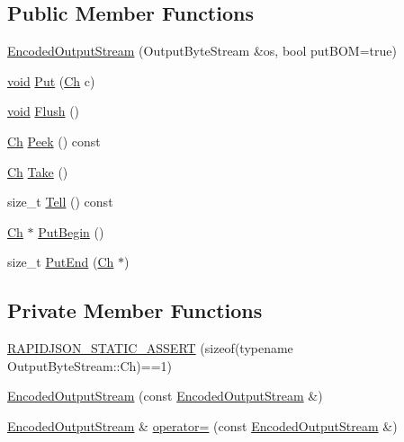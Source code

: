 \subsection*{Public Member Functions}
\begin{DoxyCompactItemize}
\item 
\hyperlink{classEncodedOutputStream_ad3360c613a30a6a15526ae9ad63bd004}{Encoded\+Output\+Stream} (Output\+Byte\+Stream \&os, bool put\+B\+OM=true)
\item 
\hyperlink{imgui__impl__opengl3__loader_8h_ac668e7cffd9e2e9cfee428b9b2f34fa7}{void} \hyperlink{classEncodedOutputStream_a0f3c00f94c195a38d78c05ecda497481}{Put} (\hyperlink{classEncodedOutputStream_aa8f494d7ee2808307fbc9cd658c0f760}{Ch} c)
\item 
\hyperlink{imgui__impl__opengl3__loader_8h_ac668e7cffd9e2e9cfee428b9b2f34fa7}{void} \hyperlink{classEncodedOutputStream_a657188f6a9f0fae01a4012c288d3fd46}{Flush} ()
\item 
\hyperlink{classEncodedOutputStream_aa8f494d7ee2808307fbc9cd658c0f760}{Ch} \hyperlink{classEncodedOutputStream_a22e00087e16ad7a12438fb34fb562bb7}{Peek} () const
\item 
\hyperlink{classEncodedOutputStream_aa8f494d7ee2808307fbc9cd658c0f760}{Ch} \hyperlink{classEncodedOutputStream_a90f5a5e1598316a417ef5b6ad3d49f36}{Take} ()
\item 
size\+\_\+t \hyperlink{classEncodedOutputStream_a1c6f6d51999b8d04e4d81d92ff725dbc}{Tell} () const
\item 
\hyperlink{classEncodedOutputStream_aa8f494d7ee2808307fbc9cd658c0f760}{Ch} $\ast$ \hyperlink{classEncodedOutputStream_a78934de4f76c9fa65238e65d3630cbc5}{Put\+Begin} ()
\item 
size\+\_\+t \hyperlink{classEncodedOutputStream_a818695f6d3fa8896e9d7d0fbdc7d4514}{Put\+End} (\hyperlink{classEncodedOutputStream_aa8f494d7ee2808307fbc9cd658c0f760}{Ch} $\ast$)
\end{DoxyCompactItemize}
\subsection*{Private Member Functions}
\begin{DoxyCompactItemize}
\item 
\hyperlink{classEncodedOutputStream_a108d370af476c4c5cbc1eeeb7a171d1e}{R\+A\+P\+I\+D\+J\+S\+O\+N\+\_\+\+S\+T\+A\+T\+I\+C\+\_\+\+A\+S\+S\+E\+RT} (sizeof(typename Output\+Byte\+Stream\+::\+Ch)==1)
\item 
\hyperlink{classEncodedOutputStream_a247a71781f8ba29b7f8e7182bf398c7c}{Encoded\+Output\+Stream} (const \hyperlink{classEncodedOutputStream}{Encoded\+Output\+Stream} \&)
\item 
\hyperlink{classEncodedOutputStream}{Encoded\+Output\+Stream} \& \hyperlink{classEncodedOutputStream_aea0f29efebf92a500632f02f2d961a96}{operator=} (const \hyperlink{classEncodedOutputStream}{Encoded\+Output\+Stream} \&)
\end{DoxyCompactItemize}
